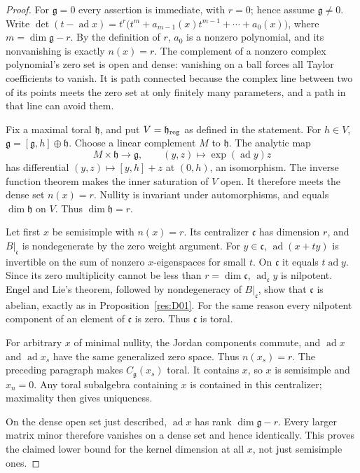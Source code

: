 \begin{proof}
For \(\mathfrak g=0\) every assertion is immediate, with
\(r=0\); hence assume \(\mathfrak g\ne0\).
Write
\(\det(t-\operatorname{ad}x)=t^r
\bigl(t^{m}+a_{m-1}(x)t^{m-1}+\cdots+a_0(x)\bigr)\),
where \(m=\dim\mathfrak g-r\).
By the definition of \(r\), \(a_0\) is a nonzero polynomial,
and its nonvanishing is exactly \(n(x)=r\).
The complement of a nonzero complex polynomial's zero set is
open and dense: vanishing on a ball forces all Taylor
coefficients to vanish. It is path connected because the complex
line between two of its points meets the zero set at only
finitely many parameters, and a path in that line can avoid them.

Fix a maximal toral \(\mathfrak h\), and put
\(V=\mathfrak h_{\rm reg}\) as defined in the statement.
For \(h\in V\),
\(\mathfrak g=[\mathfrak g,h]\oplus\mathfrak h\).
Choose a linear complement \(M\) to \(\mathfrak h\).
The analytic map
\[
 M\times\mathfrak h\longrightarrow\mathfrak g,\qquad
 (y,z)\longmapsto\exp(\operatorname{ad}y)z
\]
has differential \((y,z)\mapsto[y,h]+z\) at \((0,h)\),
an isomorphism. The inverse function theorem makes the inner
saturation of \(V\) open. It therefore meets the dense set
\(n(x)=r\). Nullity is invariant under automorphisms, and equals
\(\dim\mathfrak h\) on \(V\). Thus \(\dim\mathfrak h=r\).

Let first \(x\) be semisimple with \(n(x)=r\).
Its centralizer \(\mathfrak c\) has dimension \(r\), and
\(B|_{\mathfrak c}\) is nondegenerate by the zero weight argument.
For \(y\in\mathfrak c\), \(\operatorname{ad}(x+ty)\)
is invertible on the sum of nonzero \(x\)-eigenspaces for small
\(t\). On \(\mathfrak c\) it equals \(t\operatorname{ad}y\).
Since its zero multiplicity cannot be less than \(r=\dim\mathfrak c\),
\(\operatorname{ad}_{\mathfrak c}y\) is nilpotent.
Engel and Lie's theorem, followed by nondegeneracy of
\(B|_{\mathfrak c}\), show that \(\mathfrak c\) is abelian,
exactly as in Proposition~\ref{res:D01}.
For the same reason every nilpotent component of an element of
\(\mathfrak c\) is zero. Thus \(\mathfrak c\) is toral.

For arbitrary \(x\) of minimal nullity, the Jordan components
commute, and \(\operatorname{ad}x\) and \(\operatorname{ad}x_s\)
have the same generalized zero space. Thus \(n(x_s)=r\).
The preceding paragraph makes \(C_{\mathfrak g}(x_s)\) toral.
It contains \(x\), so \(x\) is semisimple and \(x_n=0\).
Any toral subalgebra containing \(x\) is contained in this
centralizer; maximality then gives uniqueness.

On the dense open set just described,
\(\operatorname{ad}x\) has rank \(\dim\mathfrak g-r\).
Every larger matrix minor therefore vanishes on a dense set
and hence identically. This proves the claimed lower bound
for the kernel dimension at all \(x\), not just semisimple ones.
\end{proof}

